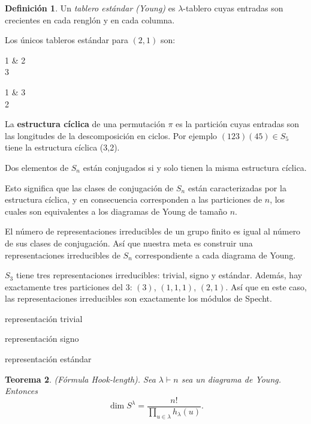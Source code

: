 \documentclass[12pt]{book}
\newtheorem{theorem}{Teorema}[section]
\theoremstyle{definition}
\newtheorem{definition}[theorem]{Definición}
\newcounter{in}
\newcounter{ini}
\begin{document}
\begin{definition}
  Un \textit{tablero estándar (Young)} es $\lambda$-tablero cuyas
  entradas son crecientes en cada renglón y en cada columna.
\end{definition}
Los únicos tableros estándar para $(2,1)$ son:
\begin{center}
  \begin{ytableau}
    1 & 2\\
    3
  \end{ytableau}\quad
  \begin{ytableau}
    1 & 3\\
    2
  \end{ytableau}
\end{center}
La \textbf{estructura cíclica} de una permutación $\pi$ es la
partición cuyas entradas son las longitudes de la descomposición en
ciclos. Por ejemplo $(123)(45)\in S_{5}$ tiene la estructura
cíclica (3,2). 

Dos elementos de $S_{n}$ están conjugados si y solo tienen la misma
estructura cíclica. 

Esto significa que las clases de conjugación de $S_{n}$ están
caracterizadas por la estructura cíclica, y en consecuencia
corresponden a las particiones de $n$, los cuales son equivalentes a
los diagramas de Young de tamaño $n$. 

El número de representaciones irreducibles de un grupo finito es igual
al número de sus clases de conjugación. Así que nuestra meta es
construir una representaciones irreducibles de $S_{n}$ correspondiente a cada diagrama de Young.



$S_{3}$ tiene tres representaciones irreducibles: trivial,
signo y estándar. Además, hay exactamente tres particiones del $3$: $(3)$, $(1,1,1)$,
$(2,1)$. Así que en este caso, las representaciones irreducibles son
exactamente los módulos de Specht. 

\begin{center}

representación trivial


representación signo


representación estándar
\end{center}


\begin{theorem}{(Fórmula Hook-length).} 
  Sea $\lambda\vdash n$ sea un diagrama de Young. Entonces
  $$\dim S^{\lambda}=\frac{n!}{\prod_{u\in \lambda}h_{\lambda}(u)}.$$
\end{theorem}
 
\end{document}
